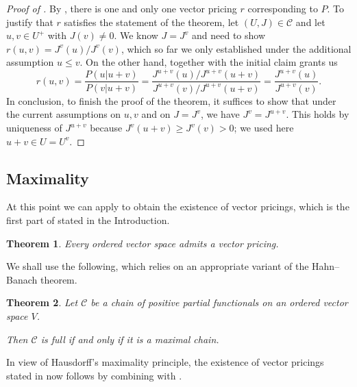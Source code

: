 \documentclass[11pt]{amsart}
\numberwithin{equation}{section}
\newtheorem{thm}{Theorem}[section]
\theoremstyle{definition}
\theoremstyle{definition}
\newcommand*{\sC}{\mathscr{C}}
\begin{document}
\begin{proof}[Proof of ]
\smallskip
By , there is one and only one vector pricing $r$ corresponding to $P$. To justify that $r$ satisfies the statement of the theorem, let $(U, J) \in \sC$ and let $u,v\in U^+$ with $J(v) \neq 0$. We know $J=J^v$ and need to show $r(u,v) = J^v(u) / J^v(v)$, which so far we only established under the additional assumption $u\leq v$. On the other hand,  together with the initial claim grants us
\begin{equation*}
r(u,v) = \frac{P(u|u+v)}{P(v|u+v)} = \frac{J^{u+v}(u) / J^{u+v}(u+v)}{J^{u+v}(v) / J^{u+v}(u+v)} = \frac{J^{u+v}(u)}{J^{u+v}(v)}.
\end{equation*}
In conclusion, to finish the proof of the theorem, it suffices to show that under the current assumptions on $u,v$ and on $J=J^v$, we have $J^v=J^{u+v}$. This holds by uniqueness of $J^{u+v}$ because $J^v(u+v) \geq J^v(v)>0$; we used here $u+v\in U=U^v$.
\end{proof}

\subsection{Maximality}%
At this point we can apply  to obtain the existence of vector pricings, which is the first part of  stated in the Introduction.

\begin{thm}\label{thm:VP:exists}
Every ordered vector space admits a vector pricing.
\end{thm}

We shall use the following, which relies on an appropriate variant of the Hahn--Banach theorem.

\begin{thm}\label{thm:max-chain}
Let $\sC$ be a chain of positive partial functionals on an ordered vector space $V$.

Then $\sC$ is full if and only if it is a maximal chain.
\end{thm}

In view of Hausdorff's maximality principle, the existence of vector pricings stated in  now follows by combining  with .
\end{document}
